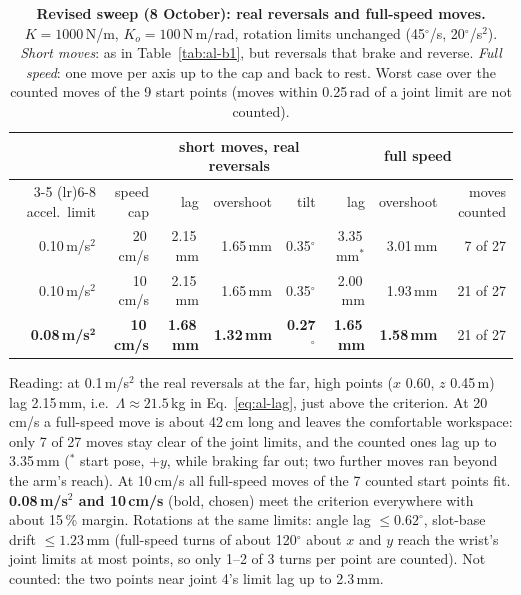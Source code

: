 \begin{table}[h]
  \centering
  \caption{\textbf{Revised sweep (8 October): real reversals and full-speed moves.} $K = 1000$\,N/m,
  $K_o = 100$\,N\,m/rad, rotation limits unchanged (45$^\circ$/s, 20$^\circ$/s$^2$). \emph{Short moves}: as in
  Table~\ref{tab:al-b1}, but reversals that brake and reverse. \emph{Full speed}: one move per axis up to the cap and
  back to rest. Worst case over the counted moves of the 9 start points (moves within 0.25\,rad of a joint limit are
  not counted).}
  \label{tab:al-final}
  {\renewcommand{\arraystretch}{1.15}
  \begin{tabular}{rrrrrrrr}
    \toprule
    & & \multicolumn{3}{c}{short moves, real reversals} & \multicolumn{3}{c}{full speed} \\
    \cmidrule(lr){3-5} \cmidrule(lr){6-8}
    accel.\ limit & speed cap & lag & overshoot & tilt & lag & overshoot & moves counted \\
    \midrule
    0.10\,m/s$^2$ & 20\,cm/s & 2.15\,mm & 1.65\,mm & 0.35$^\circ$ & 3.35\,mm$^*$ & 3.01\,mm & 7 of 27 \\
    0.10\,m/s$^2$ & 10\,cm/s & 2.15\,mm & 1.65\,mm & 0.35$^\circ$ & 2.00\,mm & 1.93\,mm & 21 of 27 \\
    \textbf{0.08\,m/s}$^\mathbf{2}$ & \textbf{10\,cm/s} & \textbf{1.68\,mm} & \textbf{1.32\,mm} & \textbf{0.27}$^\circ$ &
      \textbf{1.65\,mm} & \textbf{1.58\,mm} & 21 of 27 \\
    \bottomrule
  \end{tabular}}

  \smallskip
  {\small Reading: at 0.1\,m/s$^2$ the real reversals at the far, high points ($x$ 0.60, $z$ 0.45\,m) lag 2.15\,mm,
  i.e.\ $\Lambda \approx 21.5$\,kg in Eq.~\eqref{eq:al-lag}, just above the criterion. At 20\,cm/s a full-speed move is
  about 42\,cm long and leaves the comfortable workspace: only 7 of 27 moves stay clear of the joint limits, and the
  counted ones lag up to 3.35\,mm ($^*$ start pose, $+y$, while braking far out; two further moves ran beyond the
  arm's reach). At 10\,cm/s all full-speed moves of the 7 counted start points fit. \textbf{0.08\,m/s$^2$ and
  10\,cm/s} (bold, chosen) meet the criterion everywhere with about 15\,\% margin. Rotations at the same limits: angle
  lag $\le 0.62^\circ$, slot-base drift $\le 1.23$\,mm (full-speed turns of about 120$^\circ$ about $x$ and $y$ reach the
  wrist's joint limits at most points, so only 1--2 of 3 turns per point are counted). Not counted: the two points
  near joint 4's limit lag up to 2.3\,mm.}
\end{table}

